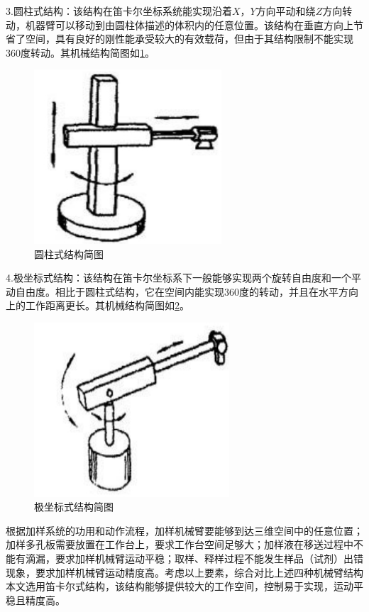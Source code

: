 3.圆柱式结构：该结构在笛卡尔坐标系统能实现沿着$X，Y$方向平动和绕$Z$方向转动，机器臂可以移动到由圆柱体描述的体积内的任意位置。该结构在垂直方向上节省了空间，具有良好的刚性能承受较大的有效载荷，但由于其结构限制不能实现$360$度转动。其机械结构简图如\ref{fig:3-3}。

\begin{figure}[htbp!]
	\centering
	\includegraphics[height=6.5cm]{chap/figure/3-3.jpg}
	\caption{圆柱式结构简图}
	\label{fig:3-3}
\end{figure}

4.极坐标式结构：该结构在笛卡尔坐标系下一般能够实现两个旋转自由度和一个平动自由度。相比于圆柱式结构，它在空间内能实现$360$度的转动，并且在水平方向上的工作距离更长。其机械结构简图如\ref{fig:3-4}。

\begin{figure}[htbp!]
	\centering
	\includegraphics[height=6.5cm]{chap/figure/3-4.jpg}
	\caption{极坐标式结构简图}
	\label{fig:3-4}
\end{figure}

根据加样系统的功用和动作流程，加样机械臂要能够到达三维空间中的任意位置；加样多孔板需要放置在工作台上，要求工作台空间足够大；加样液在移送过程中不能有滴漏，要求加样机械臂运动平稳；取样、释样过程不能发生样品（试剂）出错现象，要求加样机械臂运动精度高。考虑以上要素，综合对比上述四种机械臂结构本文选用笛卡尔式结构，该结构能够提供较大的工作空间，控制易于实现，运动平稳且精度高。
